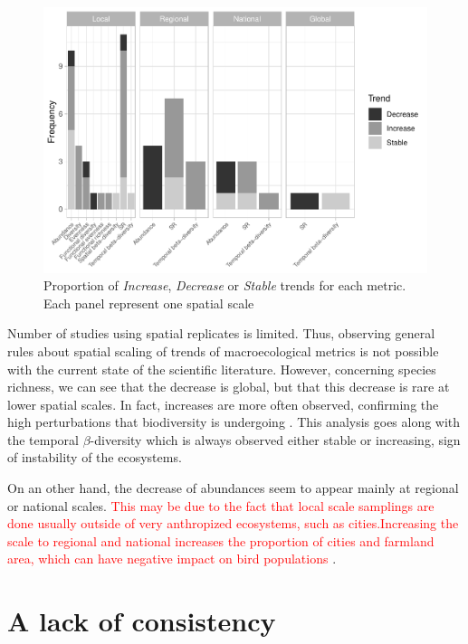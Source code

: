 \documentclass[
  12pt,
  oneside]{report}
\begin{document}
\begin{figure}
\centering
\includegraphics{literature_review_files/figure-latex/barmetricsperspatscale-1.pdf}
\caption{\label{fig:barmetricsperspatscale}Proportion of \emph{Increase}, \emph{Decrease} or \emph{Stable} trends for each metric. Each panel represent one spatial scale}
\end{figure}

Number of studies using spatial replicates is limited. Thus, observing general rules about spatial scaling of trends of macroecological metrics is not possible with the current state of the scientific literature. However, concerning species richness, we can see that the decrease is global, but that this decrease is rare at lower spatial scales. In fact, increases are more often observed, confirming the high perturbations that biodiversity is undergoing \autocite{dornelas_assemblage_2014,vaidyanathan_worlds_2021}. This analysis goes along with the temporal \(\beta\)-diversity which is always observed either stable or increasing, sign of instability of the ecosystems.

On an other hand, the decrease of abundances seem to appear mainly at regional or national scales. \textcolor{red}{This may be due to the fact that local scale samplings are done usually outside of very anthropized  ecosystems, such as cities.Increasing the scale to regional and national increases the proportion of cities and farmland area, which can have negative impact on bird populations} \autocite{reif_long-term_2013}.

\hypertarget{a-lack-of-consistency}{%
\chapter{A lack of consistency}\label{a-lack-of-consistency}}
\end{document}
